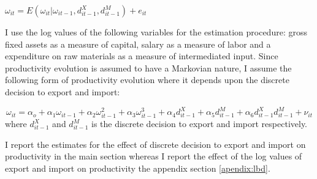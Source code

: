 \documentclass[12pt]{article}
\begin{document}
$\omega_{it} =
  E(\omega_{it}| \omega_{it-1}, d_{it-1}^{X}, d_{it-1}^{M}) + e_{it}$





I use the log values of the following variables for the estimation
procedure:  gross fixed assets as a measure of capital, salary
as a measure of labor and a expenditure on raw materials as a measure
of intermediated input. Since productivity evolution is  assumed to
have a Markovian nature, I assume the following form of productivity
evolution where it depends upon  the discrete decision to export and import:

\begin{equation}
 \omega_{it} = \alpha_{o} + \alpha_{1}\omega_{it-1} +
\alpha_{2}\omega_{it-1}^{2} + \alpha_{3}\omega_{it-1}^{3}+
\alpha_{4}d_{it-1}^{X} + \alpha_{5} d_{it-1}^{M} +
\alpha_{6}d_{it-1}^{X}d_{it-1}^{M}  + \nu_{it}
\end{equation} 
where $d_{it-1}^{X}$ and $d_{it-1}^{M}$ is the discrete decision to
export and import respectively. 

I report the estimates for the effect of discrete decision to export
and import on productivity in the main section whereas I report the
effect of the log values of export and import on productivity the
appendix section \ref{apendix:lbd}.  
\end{document}
